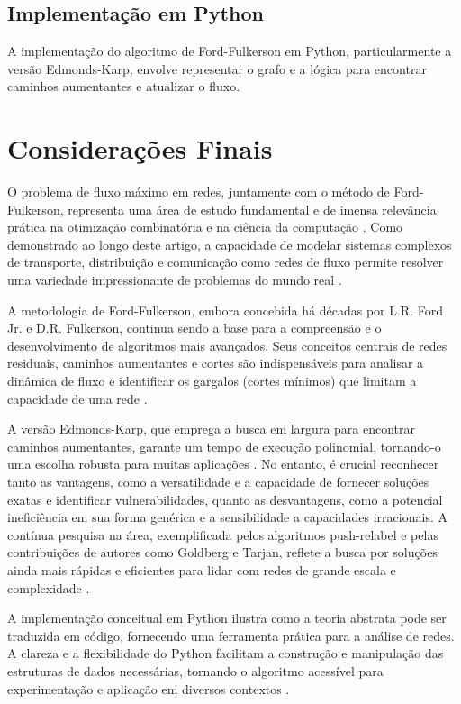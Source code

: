 \documentclass[12pt]{article}
\begin{document}
\newpage
\subsection{Implementação em Python}
A implementação do algoritmo de Ford-Fulkerson em Python, particularmente a versão Edmonds-Karp, envolve representar o grafo e a lógica para encontrar caminhos aumentantes e atualizar o fluxo.



\newpage
\section{Considerações Finais}

O problema de fluxo máximo em redes, juntamente com o método de Ford-Fulkerson, representa uma área de estudo fundamental e de imensa relevância prática na otimização combinatória e na ciência da computação \cite{ford1956}. Como demonstrado ao longo deste artigo, a capacidade de modelar sistemas complexos de transporte, distribuição e comunicação como redes de fluxo permite resolver uma variedade impressionante de problemas do mundo real \cite{ahuja1993}.

\noindent A metodologia de Ford-Fulkerson, embora concebida há décadas por L.R. Ford Jr. e D.R. Fulkerson, continua sendo a base para a compreensão e o desenvolvimento de algoritmos mais avançados. Seus conceitos centrais de redes residuais, caminhos aumentantes e cortes são indispensáveis para analisar a dinâmica de fluxo e identificar os gargalos (cortes mínimos) que limitam a capacidade de uma rede \cite{cormen2009}.

\noindent A versão Edmonds-Karp, que emprega a busca em largura para encontrar caminhos aumentantes, garante um tempo de execução polinomial, tornando-o uma escolha robusta para muitas aplicações \cite{edmonds1972theoretical}. No entanto, é crucial reconhecer tanto as vantagens, como a versatilidade e a capacidade de fornecer soluções exatas e identificar vulnerabilidades, quanto as desvantagens, como a potencial ineficiência em sua forma genérica e a sensibilidade a capacidades irracionais. A contínua pesquisa na área, exemplificada pelos algoritmos push-relabel e pelas contribuições de autores como Goldberg e Tarjan, reflete a busca por soluções ainda mais rápidas e eficientes para lidar com redes de grande escala e complexidade \cite{goldberg1988,goldberg1998faster}.

\noindent A implementação conceitual em Python ilustra como a teoria abstrata pode ser traduzida em código, fornecendo uma ferramenta prática para a análise de redes. A clareza e a flexibilidade do Python facilitam a construção e manipulação das estruturas de dados necessárias, tornando o algoritmo acessível para experimentação e aplicação em diversos contextos \cite{rossum2009python}.
\end{document}
